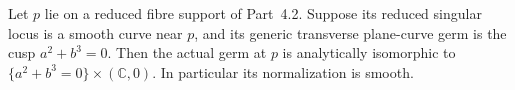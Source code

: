 
\begin{proposition}[P4.28]\hypertarget{tag-02X0}{}\label{night:P4.28}\label{stmt:P4.28}


Let $p$ lie on a reduced fibre support of Part~4.2.
Suppose its reduced singular locus is a smooth curve
near $p$, and its generic transverse plane-curve germ
is the cusp $a^2+b^3=0$. Then the actual germ at $p$
is analytically isomorphic to
$\{a^2+b^3=0\}\times(\mathbb C,0)$.
In particular its normalization is smooth.
\end{proposition}

